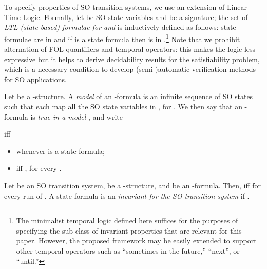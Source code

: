 \documentclass[conference]{IEEEtran}
\begin{document}
To specify properties of SO transition systems, we use an extension of
Linear Time Logic. Formally, let
 be SO state variables and  be a
signature; the set 
of \emph{LTL (state-based) formulae for  and
  } is inductively defined as
follows:
state formulae are in  and if  is
a state formula then  is in
.\footnote{The
  minimalist temporal logic defined here suffices for the purposes of
  specifying the sub-class of invariant properties that are relevant
  for this paper.  However, the proposed framework may be easily
  extended to support other temporal operators such as ``sometimes in
  the future,'' ``next'', or ``until.''} Note that we prohibit
alternation of FOL quantifiers and temporal operators: this makes the
logic less expressive but it helps to derive decidability results for
the satisfiability problem, which is a necessary condition to develop
(semi-)automatic verification methods for SO applications.


Let  be a -structure.  A \emph{model} of an
-formula is an
infinite sequence  of SO states such that
each  map all the SO state variables in
, for .
We then say that an
-formula
 is \emph{true in a model
}, and write

iff
\begin{itemize}
\item  whenever
   is a state formula;
\item  iff , for every .
\end{itemize}

Let  be
an SO transition system,  be a -structure, and
 be an
-formula.  Then,
 iff
 for every run  of .
A state formula  is an
\emph{invariant for the SO transition system } if
.
\end{document}
